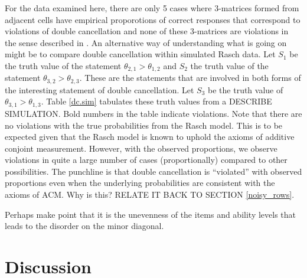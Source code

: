 \documentclass[12pt]{article}
\newcommand{\putbib}[1]{


}
\begin{document}
For the data examined here, there are only 5 cases where 3-matrices formed from adjacent cells have empirical proporotions of correct responses that correspond to violations of double cancellation and none of these 3-matrices are violations in the sense described in . An alternative way of understanding what is going on might be to compare double cancellation within simulated Rasch data. Let $S_1$ be the truth value of the statement $\theta_{2,1}>\theta_{1,2}$ and $S_2$ the truth value of the statement $\theta_{3,2}>\theta_{2,3}$. These are the statements that are involved in both forms of the interesting statement of double cancellation. Let $S_3$ be the truth value of $\theta_{3,1}>\theta_{1,3}$. Table \ref{dc.sim} tabulates these truth values from a DESCRIBE SIMULATION. Bold numbers in the table indicate violations. Note that there are no violations with the true probabilities from the Rasch model. This is to be expected given that the Rasch model is known to uphold the axioms of additive conjoint measurement. However, with the observed proportions, we observe violations in quite a large number of cases (proportionally) compared to other possibilities. The punchline is that double cancellation is ``violated'' with observed proportions even when the underlying probabilities are consistent with the axioms of ACM. Why is this? RELATE IT BACK TO SECTION \ref{noisy_rows}.





Perhaps make point that it is the unevenness of the items and ability levels that leads to the disorder on the minor diagonal.



\section{Discussion}

\putbib{conjoint}
\end{document}
